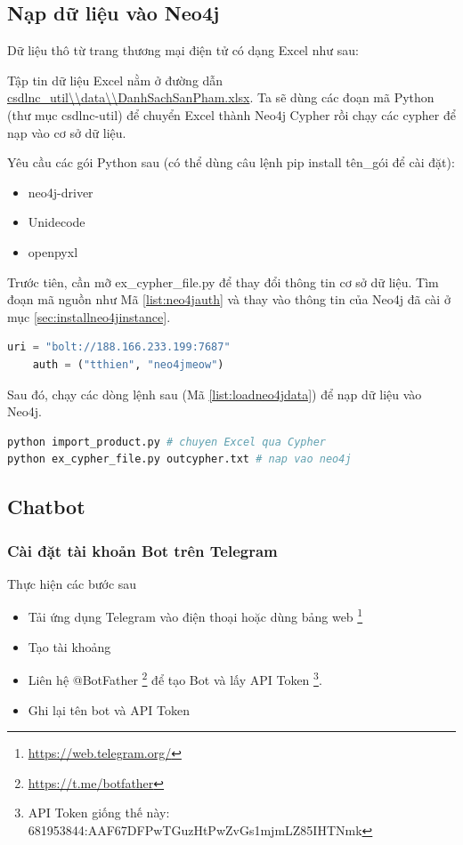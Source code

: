\subsection{Nạp dữ liệu vào Neo4j}\label{sec:csdlncutil}

Dữ liệu thô từ trang thương mại điện tử có dạng Excel như sau: 


Tập tin dữ liệu Excel nằm ở đường dẫn \url{csdlnc_util\\data\\DanhSachSanPham.xlsx}. Ta sẽ dùng các đoạn mã Python (thư mục csdlnc-util) để chuyển Excel thành Neo4j Cypher rồi chạy các cypher để nạp vào cơ sở dữ liệu. 

Yêu cầu các gói Python sau (có thể dùng câu lệnh pip install tên\_gói để cài đặt): 

\begin{itemize}
\item neo4j-driver
\item Unidecode 
\item openpyxl
\end{itemize}

Trước tiên, cần mỡ ex\_cypher\_file.py để thay đổi thông tin cơ sở dữ liệu. Tìm đoạn mã nguồn như Mã \ref{list:neo4jauth} và thay vào thông tin của Neo4j đã cài ở mục \ref{sec:installneo4jinstance}.

\begin{lstlisting}[language=python,caption={Thông tin Neo4j},label={list:neo4jauth}]
    uri = "bolt://188.166.233.199:7687"
    auth = ("tthien", "neo4jmeow")
\end{lstlisting}

Sau đó, chạy các dòng lệnh sau (Mã \ref{list:loadneo4jdata}) để nạp dữ liệu vào Neo4j.

\begin{lstlisting}[language=bash,caption={Cài Neo4j},label={list:loadneo4jdata}]
python import_product.py # chuyen Excel qua Cypher
python ex_cypher_file.py outcypher.txt # nap vao neo4j 
\end{lstlisting}

\subsection{Chatbot}
\subsubsection{Cài đặt tài khoản Bot trên Telegram}
Thực hiện các bước sau
\begin{itemize}
\item Tải ứng dụng Telegram vào điện thoại hoặc dùng bảng web \footnote{\url{https://web.telegram.org/}}
\item Tạo tài khoảng 
\item Liên hệ @BotFather \footnote{\url{https://t.me/botfather}} để tạo Bot và lấy API Token \footnote{API Token giống thế này: 681953844:AAF67DFPwTGuzHtPwZvGs1mjmLZ85IHTNmk}. 
\item Ghi lại tên bot và API Token 
\end{itemize}

